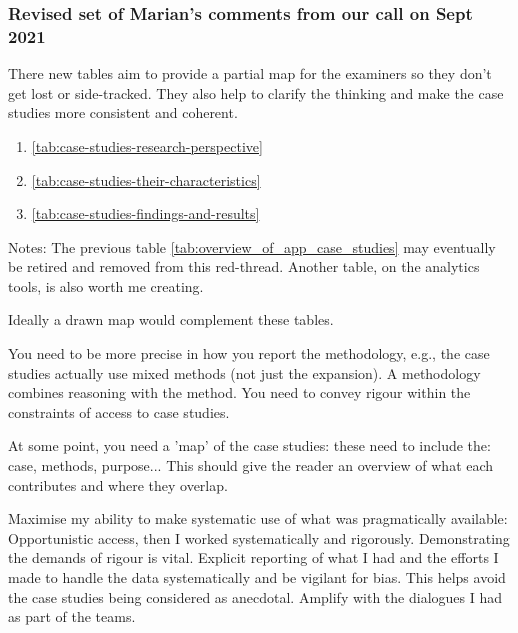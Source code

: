 \subsubsection{Revised set of Marian's comments from our call on  Sept 2021}


There new tables aim to provide a partial map for the examiners so they don't get lost or side-tracked. They also help to clarify the thinking and make the case studies more consistent and coherent.

\begin{enumerate}
    \item \ref{tab:case-studies-research-perspective} 
    \item \ref{tab:case-studies-their-characteristics} 
    \item \ref{tab:case-studies-findings-and-results} 
\end{enumerate}

Notes: The previous table \ref{tab:overview_of_app_case_studies}  may eventually be retired and removed from this red-thread. Another table, on the analytics tools, is also worth me creating.

Ideally a drawn map would complement these tables.


You need to be more precise in how you report the methodology, e.g., the case studies actually use mixed methods (not just the expansion). A methodology combines reasoning with the method. You need to convey rigour within the constraints of access to case studies.

At some point, you need a 'map' of the case studies:  these need to include the: case, methods, purpose...  This should give the reader an overview of what each contributes and where they overlap.


Maximise my ability to make systematic use of what was pragmatically available: Opportunistic access, then I worked systematically and rigorously. Demonstrating the demands of rigour is vital. Explicit reporting of what I had and the efforts I made to handle the data systematically and be vigilant for bias. This helps avoid the case studies being considered as anecdotal. Amplify with the dialogues I had as part of the teams.

